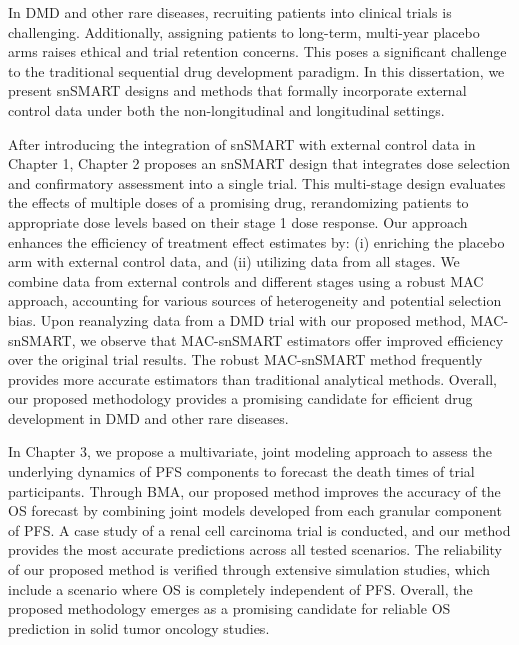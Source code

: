In \ac{DMD} and other rare diseases, recruiting patients into clinical trials is challenging. Additionally, assigning patients to long-term, multi-year placebo arms raises ethical and trial retention concerns. This poses a significant challenge to the traditional sequential drug development paradigm. In this dissertation, we present \ac{snSMART} designs and methods that formally incorporate external control data under both the non-longitudinal and longitudinal settings.

After introducing the integration of \ac{snSMART} with external control data in Chapter 1, Chapter 2 proposes an \ac{snSMART} design that integrates dose selection and confirmatory assessment into a single trial. This multi-stage design evaluates the effects of multiple doses of a promising drug, rerandomizing patients to appropriate dose levels based on their stage 1 dose response. Our approach enhances the efficiency of treatment effect estimates by: (i) enriching the placebo arm with external control data, and (ii) utilizing data from all stages. We combine data from external controls and different stages using a robust \ac{MAC} approach, accounting for various sources of heterogeneity and potential selection bias. Upon reanalyzing data from a \ac{DMD} trial with our proposed method, MAC-snSMART, we observe that MAC-snSMART estimators offer improved efficiency over the original trial results. The robust MAC-snSMART method frequently provides more accurate estimators than traditional analytical methods. Overall, our proposed methodology provides a promising candidate for efficient drug development in \ac{DMD} and other rare diseases.


In Chapter 3, we propose a multivariate, joint modeling approach to assess the underlying dynamics of \ac{PFS} components to forecast the death times of trial participants. Through \ac{BMA}, our proposed method improves the accuracy of the \ac{OS} forecast by combining joint models developed from each granular component of \ac{PFS}. A case study of a renal cell carcinoma trial is conducted, and our method provides the most accurate predictions across all tested scenarios. The reliability of our proposed method is verified through extensive simulation studies, which include a scenario where \ac{OS} is completely independent of \ac{PFS}. Overall, the proposed methodology emerges as a promising candidate for reliable \ac{OS} prediction in solid tumor oncology studies.


